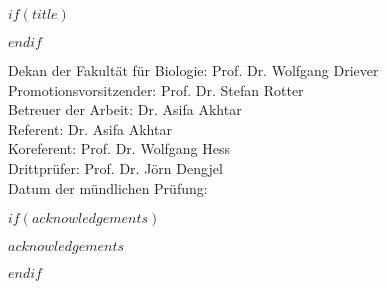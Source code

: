 \documentclass[11pt, a4paper, twoside]{MPIthesis} %
\title{\ttitle} %
\begin{document}
\frontmatter %


\fancyhead{} %
\fancyfoot[C]{\thepage}

\pagestyle{fancy} %

\newcommand{\HRule}{\rule{\linewidth}{0.5mm}} %
\renewcommand{\thesubsubsection}{\hspace*{-1.0em}} %
\renewcommand{\thefootnote}{\alph{footnote}}

\hypersetup{pdfsubject=\subjectname}
\hypersetup{pdfauthor=\authornames}


$if(title)$
  \maketitle
$endif$

\thispagestyle{empty}
\vspace*{\fill}
Dekan der Fakultät für Biologie: Prof. Dr. Wolfgang Driever \\
Promotionsvorsitzender: Prof. Dr. Stefan Rotter \\
Betreuer der Arbeit: Dr. Asifa Akhtar \\
Referent: Dr. Asifa Akhtar \\
Koreferent: Prof. Dr. Wolfgang Hess \\
Drittprüfer: Prof. Dr. Jörn Dengjel\\
Datum der mündlichen Prüfung:
\clearpage

$if(acknowledgements)$
  \begin{acknowledgements}
    $acknowledgements$
  \end{acknowledgements}
$endif$
\end{document}
